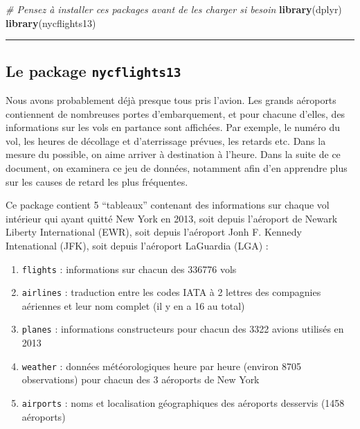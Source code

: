 \documentclass[a4paperpaper,]{article}
\newenvironment{Shaded}{\begin{snugshade}}{\end{snugshade}}
\newcommand{\KeywordTok}[1]{\textcolor[rgb]{0.13,0.29,0.53}{\textbf{#1}}}
\newcommand{\CommentTok}[1]{\textcolor[rgb]{0.56,0.35,0.01}{\textit{#1}}}
\newcommand{\NormalTok}[1]{#1}
\providecommand{\tightlist}{%
  \setlength{\itemsep}{0pt}\setlength{\parskip}{0pt}}
\theoremstyle{definition}
\theoremstyle{definition}
\theoremstyle{definition}
\theoremstyle{remark}
\begin{document}
\begin{Shaded}
\begin{Highlighting}[]
\CommentTok{# Pensez à installer ces packages avant de les charger si besoin }
\KeywordTok{library}\NormalTok{(dplyr)}
\KeywordTok{library}\NormalTok{(nycflights13)}
\end{Highlighting}
\end{Shaded}

\begin{center}\rule{0.5\linewidth}{\linethickness}\end{center}

\subsection{\texorpdfstring{Le package
\texttt{nycflights13}}{Le package nycflights13}}\label{le-package-nycflights13}

Nous avons probablement déjà presque tous pris l'avion. Les grands
aéroports contiennent de nombreuses portes d'embarquement, et pour
chacune d'elles, des informations sur les vols en partance sont
affichées. Par exemple, le numéro du vol, les heures de décollage et
d'aterrissage prévues, les retards etc. Dans la mesure du possible, on
aime arriver à destination à l'heure. Dans la suite de ce document, on
examinera ce jeu de données, notamment afin d'en apprendre plus sur les
causes de retard les plus fréquentes.

Ce package contient 5 ``tableaux'' contenant des informations sur chaque
vol intérieur qui ayant quitté New York en 2013, soit depuis l'aéroport
de Newark Liberty International (EWR), soit depuis l'aéroport Jonh F.
Kennedy Intenational (JFK), soit depuis l'aéroport LaGuardia (LGA) :

\begin{enumerate}
\def\labelenumi{\arabic{enumi}.}
\tightlist
\item
  \texttt{flights} : informations sur chacun des 336776 vols
\item
  \texttt{airlines} : traduction entre les codes IATA à 2 lettres des
  compagnies aériennes et leur nom complet (il y en a 16 au total)
\item
  \texttt{planes} : informations constructeurs pour chacun des 3322
  avions utilisés en 2013
\item
  \texttt{weather} : données météorologiques heure par heure (environ
  8705 observations) pour chacun des 3 aéroports de New York
\item
  \texttt{airports} : noms et localisation géographiques des aéroports
  desservis (1458 aéroports)
\end{enumerate}
\end{document}
